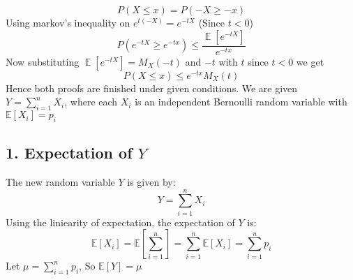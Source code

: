 \begin{solution}
	\begin{equation}
		P(X \leq x) = P(-X\geq -x)
	\end{equation}
	Using markov's inequality on $e^{t(-X)}=e^{-tX}$ (Since $t<0$)
	\begin{equation}
		P(e^{-tX}\geq e^{-tx})\leq \frac{\mathop{\mathbb{E}}[e^{-tX}]}{e^{-tx}}
	\end{equation}
	Now substituting $\mathop{\mathbb{E}}[e^{-tX}]=M_{X}(-t)$ and $- t$ with $t$ since $t<0$ we get
	\begin{equation}
		P(X\leq x)\leq e^{-tx}M_{X}(t)
	\end{equation}
	Hence both proofs are finished under given conditions.
	We are given $Y = \sum^n_{i=1}X_i$, where each $X_i$ is an independent Bernoulli random variable with $\mathds{E}[X_i] = p_i$
	\subsection*{1. Expectation of $Y$}
	The new random variable $Y$ is given by:
	\[Y = \sum^n_{i=1}X_i\]
	Using the liniearity of expectation, the expectation of $Y$ is:
	\[\mathds{E}[X_i] = \mathds{E}\left[\sum_{i=1}^{n}\right] = \sum_{i=1}^{n}\mathds{E}[X_i] = \sum_{i=1}^{n}p_i\]
	Let $\mu = \sum_{i=1}^{n}p_i$, So $\mathds{E}[Y]=\mu$

\end{solution}
